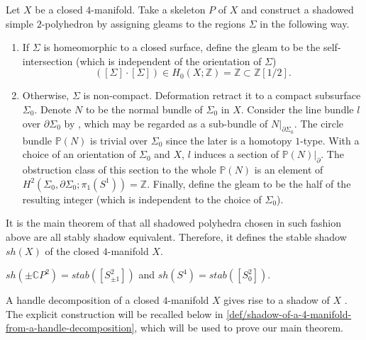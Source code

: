 \begin{definition}\label{def/stable-shadow-of-a-4-manifold}
  Let $X$ be a closed $4$-manifold. Take a skeleton $P$ of $X$
  and construct a shadowed simple $2$-polyhedron by assigning
  gleams to the regions $\Sigma$ in the following way.
  \begin{enumerate}
    \item If $\Sigma$ is homeomorphic to a closed surface, define
          the gleam to be the self-intersection (which is
          independent of the orientation of $\Sigma$)
          $$([\Sigma] \cdot [\Sigma]) \in H_{0}(X;\mathbb{Z}) = \mathbb{Z} \subset \mathbb{Z}\left[1/2\right].$$
    \item Otherwise, $\Sigma$ is non-compact. Deformation retract
          it to a compact subsurface $\Sigma_{0}$. Denote $N$ to
          be the normal bundle of $\Sigma_{0}$ in $X$. Consider
          the line bundle $l$ over $\partial \Sigma_{0}$ by
          \cite[section VIII.6.2,
          p.397]{turaev-qiok-3-manifolds}, which may be regarded
          as a sub-bundle of $N|_{\partial \Sigma_{0}}$. The
          circle bundle $\mathbb{P}(N)$ is trivial over
          $\Sigma_{0}$ since the later is a homotopy $1$-type.
          With a choice of an orientation of $\Sigma_{0}$ and
          $X$, $l$ induces a section of
          $\mathbb{P}(N)|_{\partial}$. The obstruction class of
          this section to the whole $\mathbb{P}(N)$ is an element
          of
          $H^{2}(\Sigma_{0}, \partial \Sigma_{0}; \pi_{1}(S^{1})) = \mathbb{Z}$.
          Finally, define the gleam to be the half of the
          resulting integer (which is independent to the choice
          of $\Sigma_{0}$).
  \end{enumerate}
  It is the main theorem of \cite[section
  IX.1.7]{turaev-qiok-3-manifolds} that all shadowed polyhedra
  chosen in such fashion above are all stably shadow equivalent.
  Therefore, it defines the stable shadow $sh(X)$ of the closed
  $4$-manifold $X$.
\end{definition}

\begin{example}
  $sh(\pm\mathbb{C}P^{2}) = stab([S^{2}_{\pm 1}])$ and
  $sh(S^{4}) = stab([S^{2}_{0}])$.
\end{example}

\noindent A handle decomposition of a closed $4$-manifold $X$
gives rise to a shadow of $X$ \cite[section
IX.4]{turaev-qiok-3-manifolds}. The explicit construction will be
recalled below in
\ref{def/shadow-of-a-4-manifold-from-a-handle-decomposition},
which will be used to prove our main theorem.

